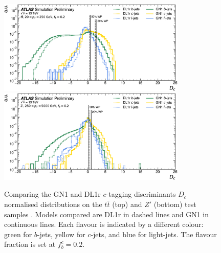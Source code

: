 \begin{figure}[h!]
  \centering
  \includegraphics[width=0.8\textwidth]{Images/FTAG/GN/GN1/eff/ttc.png}
  \includegraphics[width=0.8\textwidth]{Images/FTAG/GN/GN1/eff/zpc.png}
  \caption{Comparing the GN1 and DL1r $c$-tagging discriminants $D_c$ normalised distributions on the $t\bar{t}$ (top) and $Z'$ (bottom) test samples \cite{ATL-PHYS-PUB-2022-027}. Models compared are DL1r in dashed lines and GN1 in continuous lines. Each flavour is indicated by a different colour: green for $b$-jets, yellow for $c$-jets, and blue for light-jets. The flavour fraction is set at $f^c_b = 0.2$.}
  \label{fig:GN1disc}
\end{figure} 

